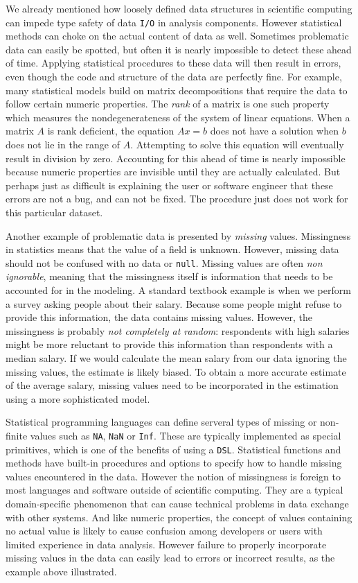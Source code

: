 \documentclass{article}
\newcommand{\DSL}{\texttt{DSL}\xspace}
\begin{document}
We already mentioned how loosely defined data structures in scientific computing can impede type safety of data \texttt{I/O} in analysis components. However statistical methods can choke on the actual content of data as well. Sometimes problematic data can easily be spotted, but often it is nearly impossible to detect these ahead of time. Applying statistical procedures to these data will then result in errors, even though the code and structure of the data are perfectly fine. For example, many statistical models build on matrix decompositions that require the data to follow certain numeric properties. The \emph{rank} of a matrix is one such property which measures the nondegenerateness of the system of linear equations. When a matrix $A$ is rank deficient, the equation $Ax=b$ does not have a solution when $b$ does not lie in the range of $A$. Attempting to solve this equation will eventually result in division by zero. Accounting for this ahead of time is nearly impossible because numeric properties are invisible until they are actually calculated. But perhaps just as difficult is explaining the user or software engineer that these errors are not a bug, and can not be fixed. The procedure just does not work for this particular dataset.

Another example of problematic data is presented by \emph{missing} values. Missingness in statistics means that the value of a field is unknown. However, missing data should not be confused with no data or \texttt{null}. Missing values are often \emph{non ignorable}, meaning that the missingness itself is information that needs to be accounted for in the modeling. A standard textbook example is when we perform a survey asking people about their salary. Because some people might refuse to provide this information, the data contains missing values. However, the missingness is probably \emph{not completely at random}: respondents with high salaries might be more reluctant to provide this information than respondents with a median salary. If we would calculate the mean salary from our data ignoring the missing values, the estimate is likely biased. To obtain a more accurate estimate of the average salary, missing values need to be incorporated in the estimation using a more sophisticated model. 

Statistical programming languages can define serveral types of missing or non-finite values such as \texttt{NA}, \texttt{NaN} or \texttt{Inf}. These are typically implemented as special primitives, which is one of the benefits of using a \DSL. Statistical functions and methods have built-in procedures and options to specify how to handle missing values encountered in the data. However the notion of missingness is foreign to most languages and software outside of scientific computing. They are a typical domain-specific phenomenon that can cause technical problems in data exchange with other systems. And like numeric properties, the concept of values containing no actual value is likely to cause confusion among developers or users with limited experience in data analysis. However failure to properly incorporate missing values in the data can easily lead to errors or incorrect results, as the example above illustrated.
\end{document}
